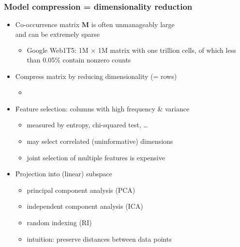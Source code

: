 \begin{frame}
  \frametitle{Model compression = dimensionality reduction}

  \begin{itemize}
  \item Co-occurrence matrix $\mathbf{M}$ is often unmanageably large\\
    and can be extremely sparse
    \begin{itemize}
    \item Google Web1T5: 1M $\times$ 1M matrix with one trillion
      cells, of which less than 0.05\% contain nonzero counts \citep{Evert:10a}
    \end{itemize}
  \item[\So] Compress matrix by reducing dimensionality (= rows)
    \begin{itemize}
    \item[]\pause
    \end{itemize}
  \item \h{Feature selection}: columns with high frequency \& variance
    \begin{itemize}
    \item measured by entropy, chi-squared test, \ldots
    \item may select correlated (\so uninformative) dimensions
    \item joint selection of multiple features is expensive
    \end{itemize}
    \pause
  \item \h{Projection} into (linear) subspace
    \begin{itemize}
    \item principal component analysis (PCA)
    \item independent component analysis (ICA)
    \item random indexing (RI)
    \item[\hand] intuition: preserve distances between data points
    \end{itemize}
  \end{itemize}
\end{frame}


